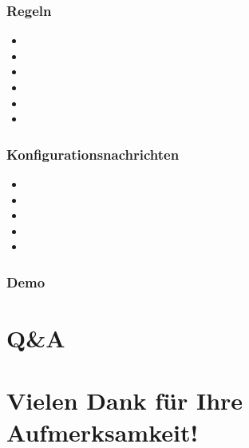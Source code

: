 \documentclass{beamer}
\begin{document}
\begin{frame}
    \frametitle{Regeln}

    \begin{itemize}
        \item 
        \item
        \item
        \item
        \item
        \item
    \end{itemize}
\end{frame}

\begin{frame}
    \frametitle{Konfigurationsnachrichten}

    \begin{itemize}
        \item
        \item
        \item
        \item
        \item
    \end{itemize}
\end{frame}

\begin{frame}
    \frametitle{Demo}
\end{frame}

\section{Q\&A}

\section{Vielen Dank für Ihre Aufmerksamkeit!}



\end{document}
